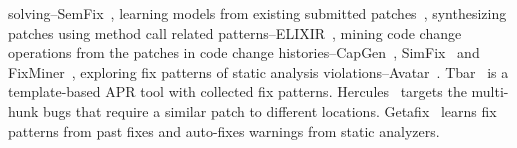solving--SemFix~\cite{nguyen2013semfix}, learning models from existing
submitted
patches~\cite{long2016automatic,long2017automatic,le2016history},
synthesizing patches using method call related
patterns--ELIXIR~\cite{saha2017elixir}, mining code change operations
from the patches in code change
histories--CapGen~\cite{wen2018context}, SimFix~\cite{Simfix} and
FixMiner~\cite{koyuncu2018fixminer}, exploring fix patterns of static
analysis
violations--Avatar~\cite{liu2019avatar}. Tbar~\cite{tbar-issta19} is a
template-based APR tool with collected fix patterns.
Hercules~\cite{10.1109/ICSE.2019.00020} targets the multi-hunk bugs
that require a similar patch to different
locations. Getafix~\cite{bader2019getafix} learns fix patterns from
past fixes and auto-fixes warnings from static analyzers.







